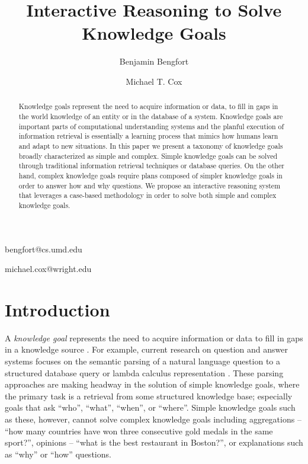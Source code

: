 \documentclass[11pt,letterpaper]{article}
\begin{document}
\title{Interactive Reasoning to Solve Knowledge Goals}

\author{Benjamin Bengfort}{bengfort@cs.umd.edu}
\address{Department of Computer Science, University of Maryland,
         College Park, MD 20742 USA}
\author{Michael T. Cox}{michael.cox@wright.edu}
\address{Wright State Research Institute,
         Beavercreek, OH 45431 USA}
\vskip 0.2in

\begin{abstract}
Knowledge goals represent the need to acquire information or data, to fill in gaps in the world knowledge of an entity or in the database of a system. Knowledge goals are important parts of computational understanding systems and the planful execution of information retrieval is essentially a learning process that mimics how humans learn and adapt to new situations. In this paper we present a taxonomy of knowledge goals broadly characterized as simple and complex. Simple knowledge goals can be solved through traditional information retrieval techniques or database queries. On the other hand, complex knowledge goals require plans composed of simpler knowledge goals in order to answer how and why questions. We propose an interactive reasoning system that leverages a case-based methodology in order to solve both simple and complex knowledge goals.
\end{abstract}

\section{Introduction}

A \textit{knowledge goal} represents the need to acquire information or data to fill in gaps in a knowledge source \cite{ram_goal-based_1991}. For example, current research on question and answer systems focuses on the semantic parsing of a natural language question to a structured database query or lambda calculus representation \cite{yahya_natural_2012,unger_template-based_2012,berant_semantic_2013}. These parsing approaches are making headway in the solution of simple knowledge goals, where the primary task is a retrieval from some structured knowledge base; especially goals that ask “who”, “what”, “when”, or “where”. Simple knowledge goals such as these, however, cannot solve complex knowledge goals including aggregations – “how many countries have won three consecutive gold medals in the same sport?”, opinions – “what is the best restaurant in Boston?”, or explanations such as “why” or “how” questions.
\end{document}
